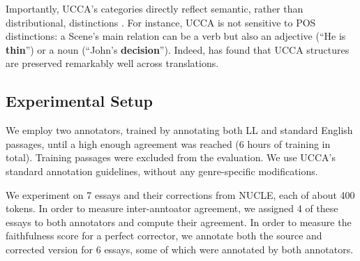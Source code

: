 \documentclass[letter,11pt]{article}
\begin{document}
Importantly, UCCA's categories directly reflect semantic, rather than distributional, distinctions .
For instance, UCCA is not sensitive to POS distinctions: a Scene's main relation can be a verb but also an adjective
(``He is {\bf thin}'') or a noun (``John's {\bf decision}'').
Indeed,  has found
that UCCA structures are preserved remarkably well across translations.


\subsection{Experimental Setup}

We employ two annotators, trained by annotating both LL and standard English
passages, until a high enough agreement was reached (6 hours of training in total).
Training passages were excluded from the evaluation.
We use UCCA's standard annotation guidelines, without any genre-specific modifications.

We experiment on 7 essays and their corrections from NUCLE, each of about 400 tokens.
In order to measure inter-anntoator agreement, we assigned 4 of these essays to both annotators
and compute their agreement.
In order to measure the faithfulness score for a perfect corrector, we annotate both
the source and corrected version for 6 essays, some of which were annotated by
both annotators.



\end{document}
